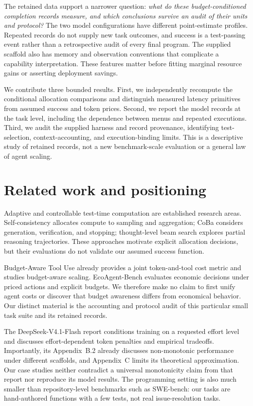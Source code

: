 \documentclass[11pt]{article}
\begin{document}
The retained data support a narrower question: \emph{what do these budget-conditioned completion records measure, and which conclusions survive an audit of their units and protocol?} The two model configurations have different point-estimate profiles. Repeated records do not supply new task outcomes, and success is a test-passing event rather than a retrospective audit of every final program. The supplied scaffold also has memory and observation conventions that complicate a capability interpretation. These features matter before fitting marginal resource gains or asserting deployment savings.

We contribute three bounded results. First, we independently recompute the conditional allocation comparisons and distinguish measured latency primitives from assumed success and token prices. Second, we report the model records at the task level, including the dependence between menus and repeated executions. Third, we audit the supplied harness and record provenance, identifying test-selection, context-accounting, and execution-binding limits. This is a descriptive study of retained records, not a new benchmark-scale evaluation or a general law of agent scaling.

\section{Related work and positioning}
Adaptive and controllable test-time computation are established research areas\citep{alomrani2025reasoningbudget}. Self-consistency allocates compute to sampling and aggregation\citep{wang2023selfconsistency}; CoBa considers generation, verification, and stopping\citep{zhou2026coba}; thought-level beam search explores partial reasoning trajectories\citep{yang2026gambit}. These approaches motivate explicit allocation decisions, but their evaluations do not validate our assumed success function.

Budget-Aware Tool Use already provides a joint token-and-tool cost metric and studies budget-aware scaling\citep{liu2025budgettooluse}. EcoAgent-Bench evaluates economic decisions under priced actions and explicit budgets\citep{wu2026ecoagentbench}. We therefore make no claim to first unify agent costs or discover that budget awareness differs from economical behavior. Our distinct material is the accounting and protocol audit of this particular small task suite and its retained records.

The DeepSeek-V4.1-Flash report conditions training on a requested effort level and discusses effort-dependent token penalties and empirical tradeoffs\citep{v41flash2026}. Importantly, its Appendix~B.2 already discusses non-monotonic performance under different scaffolds, and Appendix~C limits its theoretical approximation. Our case studies neither contradict a universal monotonicity claim from that report nor reproduce its model results. The programming setting is also much smaller than repository-level benchmarks such as SWE-bench\citep{jimenez2024swebench}: our tasks are hand-authored functions with a few tests, not real issue-resolution tasks.
\end{document}
